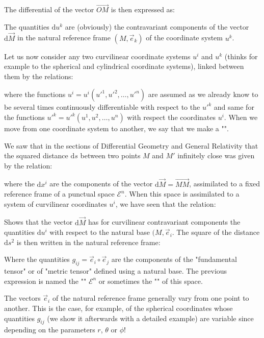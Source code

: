	The differential of the vector $\overrightarrow{OM}$ is then expressed as:
	
	The quantities $\mathrm{d}u^k$ are (obviously) the contravariant components of the vector $\mathrm{d}\vec{M}$ in the natural reference frame $(M,\vec{e}_k)$ of the coordinate system $u^k$.
	
	Let us now consider any two curvilinear coordinate systems $u^i$ and $u^k$ (thinks for example to the spherical and cylindrical coordinate systems), linked between them by the relations:
	
	where the functions $u^i=u^i({u'}^1,{u'}^2,\ldots,{u'}^n)$ are assumed as we already know to be several times continuously differentiable with respect to the ${u'}^k$ and same for the functions ${u'}^k={u'}^k(u^1,u^2,\ldots,u^n)$ with respect the coordinates $u^i$. When we move from one coordinate system to another, we say that we make a "".
	
	We saw that in the sections of Differential Geometry and General Relativity that the squared distance $\mathrm{d}s$ between two points $M$ and $M'$ infinitely close was given by the relation:
	
	where the $\mathrm{d}x^i$ are the components of the vector $\mathrm{d}\vec{M}=\overrightarrow{MM}$, assimilated to a fixed reference frame of a punctual space $\mathcal{E}^n$. When this space is assimilated to a system of curvilinear coordinates $u^i$, we have seen that the relation:
	
	Shows that the vector $\mathrm{d}\vec{M}$ has for curvilinear contravariant components the quantities $\mathrm{d}u^i$ with respect to the natural base $(M,\vec{e}_i$. The square of the distance $\mathrm{d}s^2$ is then written in the natural reference frame:
	
	Where the quantities $g_{ij}=\vec{e}_i\circ\vec{e}_j$ are the components of the "fundamental tensor" or of "metric tensor" defined using a natural base. The previous expression is named the  "" $\mathcal{E}^n$ or sometimes the "" of this space.
	
	The vectors $\vec{e}_i$ of the natural reference frame generally vary from one point to another. This is the case, for example, of the spherical coordinates whose quantities $g_{ij}$ (we show it afterwards with a detailed example) are variable since depending on the parameters $r$, $\theta$ or $\phi$!
	
